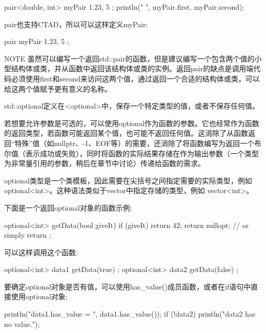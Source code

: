 \begin{cpp}
pair<double, int> myPair { 1.23, 5 };
println("{} {}", myPair.first, myPair.second);
\end{cpp}

pair也支持CTAD，所以可以这样定义myPair:

\begin{cpp}
pair myPair { 1.23, 5 };
\end{cpp}

\begin{myNotic}{NOTE}
虽然可以编写一个返回std::pair的函数，但是建议编写一个包含两个值的小型结构体或类，并从函数中返回该结构体或类的实例。返回pair的缺点是调用端代码必须使用first和second来访问这两个值，通过返回一个合适的结构体或类，可以给这两个值赋予更有意义的名称。
\end{myNotic}


std::optional定义在<optional>中，保存一个特定类型的值，或者不保存任何值。

若想要允许参数是可选的，可以使用optional作为函数的参数。它也经常作为函数的返回类型，若函数可能返回某个值，也可能不返回任何值。这消除了从函数返回“特殊”值（如nullptr、-1、EOF等）的需要，还消除了将函数编写为返回一个布尔值（表示成功或失败），同时将函数的实际结果存储在作为输出参数（一个类型为非常量引用的参数，稍后在章节中讨论）传递给函数的需求。

optional类型是一个类模板，因此需要在尖括号之间指定需要的实际类型，例如 optional<int>。这种语法类似于vector中指定存储的类型，例如 vector<int>。

下面是一个返回optional对象的函数示例:

\begin{cpp}
optional<int> getData(bool giveIt)
{
    if (giveIt) {
        return 42;
    }
    return nullopt; // or simply return {};
}
\end{cpp}

可以这样调用这个函数:

\begin{cpp}
optional<int> data1 { getData(true) };
optional<int> data2 { getData(false) };
\end{cpp}

要确定optional对象是否有值，可以使用has\_value()成员函数，或者在if语句中直接使用optional对象:

\begin{cpp}
println("data1.has_value = {}", data1.has_value());
if (!data2) {
    println("data2 has no value.");
}
\end{cpp}

